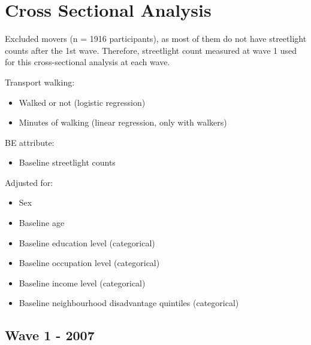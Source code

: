 \documentclass[
]{book}
\providecommand{\tightlist}{%
  \setlength{\itemsep}{0pt}\setlength{\parskip}{0pt}}
\begin{document}
\hypertarget{cross-sectional-analysis}{%
\chapter{Cross Sectional Analysis}\label{cross-sectional-analysis}}

Excluded movers (n = 1916 participants), as most of them do not have streetlight counts after the 1st wave. Therefore, streetlight count measured at wave 1 used for this cross-sectional analysis at each wave.

Transport walking:

\begin{itemize}
\tightlist
\item
  Walked or not (logistic regression)
\item
  Minutes of walking (linear regression, only with walkers)
\end{itemize}

BE attribute:

\begin{itemize}
\tightlist
\item
  Baseline streetlight counts
\end{itemize}

Adjusted for:

\begin{itemize}
\tightlist
\item
  Sex
\item
  Baseline age
\item
  Baseline education level (categorical)
\item
  Baseline occupation level (categorical)
\item
  Baseline income level (categorical)
\item
  Baseline neighbourhood disadvantage quintiles (categorical)
\end{itemize}

\hypertarget{wave-1---2007}{%
\section{Wave 1 - 2007}\label{wave-1---2007}}
\end{document}
